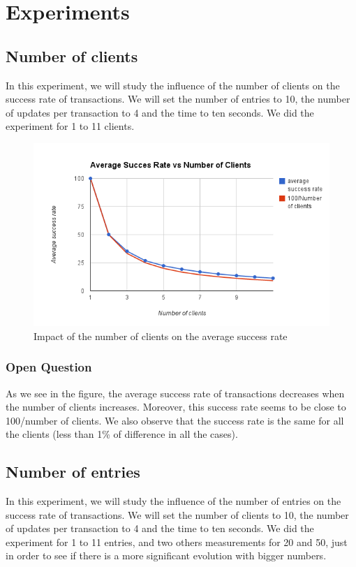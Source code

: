 \documentclass[a4paper, 11pt]{article}
\begin{document}
\section{Experiments}

\subsection{Number of clients}
In this experiment, we will study the influence of the number of clients on the success rate of transactions. We will set the number of entries to 10, the number of updates per transaction to 4 and the time to ten seconds. We did the experiment for 1 to 11 clients.

\begin{figure}[H]
\begin{center}
\includegraphics[scale=0.5]{exp1.png}
\caption{Impact of the number of clients on the average success rate}
\end{center}
\end{figure}

\subsubsection{Open Question}
As we see in the figure, the average success rate of transactions decreases when the number of clients increases. Moreover, this success rate seems to be close to 100/number of clients. We also observe that the success rate is the same for all the clients (less than 1\% of difference in all the cases).


\subsection{Number of entries}
In this experiment, we will study the influence of the number of entries on the success rate of transactions. We will set the number of clients to 10, the number of updates per transaction to 4 and the time to ten seconds. We did the experiment for 1 to 11 entries, and two others measurements for 20 and 50, just in order to see if there is a more significant evolution with bigger numbers.
\end{document}
